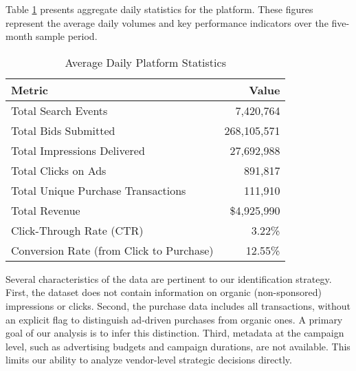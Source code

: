 Table \ref{tab:summary_stats} presents aggregate daily statistics for the platform. These figures represent the average daily volumes and key performance indicators over the five-month sample period.

\begin{table}[htbp!]
\centering
\caption{Average Daily Platform Statistics}
\label{tab:summary_stats}
\begin{tabular}{lr}
\toprule
Metric & Value \\
\midrule
Total Search Events & 7,420,764 \\
Total Bids Submitted & 268,105,571 \\
Total Impressions Delivered & 27,692,988 \\
Total Clicks on Ads & 891,817 \\
Total Unique Purchase Transactions & 111,910 \\
Total Revenue & \$4,925,990 \\
Click-Through Rate (CTR) & 3.22\% \\
Conversion Rate (from Click to Purchase) & 12.55\% \\
\bottomrule
\end{tabular}
\end{table}

Several characteristics of the data are pertinent to our identification strategy. First, the dataset does not contain information on organic (non-sponsored) impressions or clicks. Second, the purchase data includes all transactions, without an explicit flag to distinguish ad-driven purchases from organic ones. A primary goal of our analysis is to infer this distinction. Third, metadata at the campaign level, such as advertising budgets and campaign durations, are not available. This limits our ability to analyze vendor-level strategic decisions directly.
